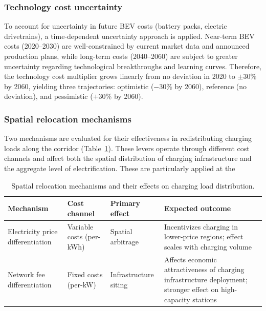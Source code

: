 \documentclass[preprint,10pt,review, authoryear]{elsarticle}
\begin{document}
        \subsubsection{Technology cost uncertainty}
        To account for uncertainty in future BEV costs (battery packs, electric drivetrains), a time-dependent uncertainty approach is applied. Near-term BEV costs (2020--2030) are well-constrained by current market data and announced production plans, while long-term costs (2040--2060) are subject to greater uncertainty regarding technological breakthroughs and learning curves. Therefore, the technology cost multiplier grows linearly from no deviation in 2020 to $\pm$30\% by 2060, yielding three trajectories: optimistic ($-$30\% by 2060), reference (no deviation), and pessimistic ($+$30\% by 2060).

        \subsubsection{Spatial relocation mechanisms}
        Two mechanisms are evaluated for their effectiveness in redistributing charging loads along the corridor (Table~\ref{tab:relocation_mechanisms}). These levers operate through different cost channels and affect both the spatial distribution of charging infrastructure and the aggregate level of electrification. These are particularly applied at the 

        \begin{table}[H]
        \centering
        \caption{Spatial relocation mechanisms and their effects on charging load distribution.}
        \label{tab:relocation_mechanisms}
        \begin{tabular}{@{}p{2.8cm}p{3.5cm}p{3cm}p{4cm}@{}}
        \toprule
        \textbf{Mechanism} & \textbf{Cost channel} & \textbf{Primary effect} & \textbf{Expected outcome} \\ \midrule
        Electricity price differentiation & Variable costs (per-kWh) & Spatial arbitrage & Incentivizes charging in lower-price regions; effect scales with charging volume \\
        \addlinespace
        Network fee differentiation & Fixed costs (per-kW) & Infrastructure siting & Affects economic attractiveness of charging infrastructure deployment; stronger effect on high-capacity stations \\
        \bottomrule
        \end{tabular}
        \end{table}
\end{document}

